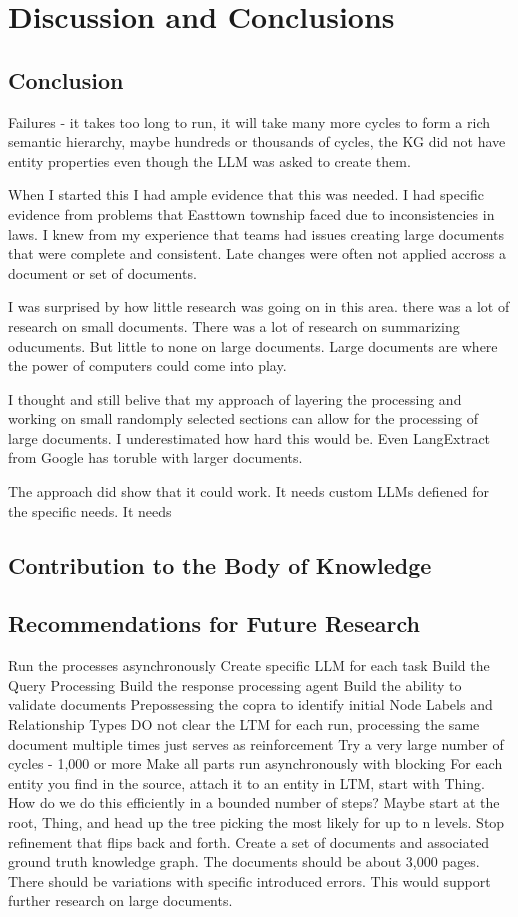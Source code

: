 \chapter{Discussion and Conclusions}
\section{Conclusion}

Failures - it takes too long to run, it will take many more cycles to form a rich semantic hierarchy, maybe hundreds or thousands of cycles, the KG did not have entity properties even though the LLM was asked to create them.

When I started this I had ample evidence that this was needed. I had specific evidence from problems that Easttown township faced due to inconsistencies in laws. I knew from my experience that teams had issues creating large documents that were complete and consistent. Late changes were often not applied accross a document or set of documents.

I was surprised by how little research was going on in this area. there was a lot of research on small documents. There was a lot of research on summarizing oducuments. But little to none on large documents. Large documents are where the power of computers could come into play.

I thought and still belive that my approach of layering the processing and working on small randomply selected sections can allow for the processing of large documents. I underestimated how hard this would be. Even LangExtract from Google has toruble with larger documents.

The approach did show that it could work. It needs custom LLMs defiened for the specific needs. It needs

\section{Contribution to the Body of Knowledge}


\section{Recommendations for Future Research}

Run the processes asynchronously
Create specific LLM for each task
Build the Query Processing
Build the response processing agent
Build the ability to validate documents
Prepossessing the copra to identify initial Node Labels and Relationship Types
DO not clear the LTM for each run, processing the same document multiple times just serves as reinforcement
Try a very large number of cycles - 1,000 or more
Make all parts run asynchronously with blocking
For each entity you find in the source, attach it to an entity in LTM, start with Thing. How do we do this efficiently in a bounded number of steps? Maybe start at the root, Thing, and head up the tree picking the most likely for up to n levels.
Stop refinement that flips back and forth.
Create a set of documents and associated ground truth knowledge graph. The documents should be about 3,000 pages. There should be variations with specific introduced errors. This would support further research on large documents.
